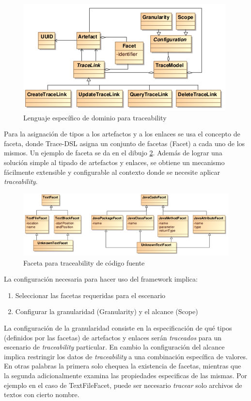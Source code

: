 \documentclass[a4paper,12pt,twoside,spanish,openright]{book}
\begin{document}
\begin{figure}[hbtp]
\centering
\includegraphics[scale=.93]{./img/Trace-DSL}
\caption{Lenguaje específico de dominio para traceability}
\label{fig:DSLTrace}
\end{figure}

Para la asignación de tipos a los artefactos y a los enlaces se usa el concepto de faceta, donde \textsf{Trace-DSL} asigna un conjunto de facetas (\textsf{Facet}) a cada uno de los mismos. Un ejemplo de faceta se da en el dibujo \ref{fig:FacetaCodigoFuente}. Además de lograr una solución simple al tipado de artefactos y enlaces, se obtiene un mecanismo fácilmente extensible y configurable al contexto donde se necesite aplicar \textit{traceability}.

\begin{figure}[hbtp]
\centering
\includegraphics[scale=.72]{./img/Faceta}
\caption{Faceta para traceability de código fuente}
\label{fig:FacetaCodigoFuente}
\end{figure}

La configuración necesaria para hacer uso del framework implica:

\begin{enumerate}
\item Seleccionar las facetas requeridas para el escenario
\item Configurar la granularidad (\textsf{Granularity}) y el alcance (\textsf{Scope})
\end{enumerate}

La configuración de la granularidad consiste en la especificación de qué tipos (definidos por las facetas) de artefactos y enlaces serán \textit{traceados} para un escenario de \textit{traceability} particular. En cambio la configuración del alcance implica restringir los datos de \textit{traceability} a una combinación específica de valores. En otras palabras la primera solo chequea la existencia de facetas, mientras que la segunda adicionalmente examina las propiedades especificas de las mismas. Por ejemplo en el caso de \textsf{TextFileFacet}, puede ser necesario \textit{tracear} solo archivos de textos con cierto nombre.
\end{document}
